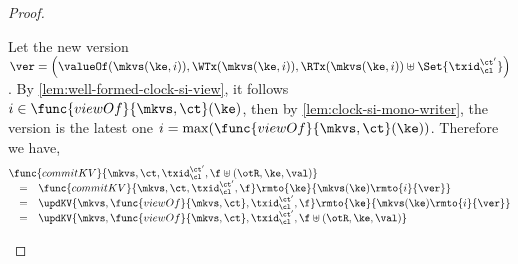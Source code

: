 \begin{proof}
\begin{itemize}
\[{                } 
            \]
            Let the new version \( \ver = \left( \valueOf(\mkvs(\ke,i)), \WTx(\mkvs(\ke,i)), \RTx(\mkvs(\ke,i)) \uplus \Set{\txid_\cl^{\ct'}} \right) \).
            By \cref{lem:well-formed-clock-si-view}, it follows \( i \in \func{viewOf}{\mkvs,\ct}(\ke) \), then by \cref{lem:clock-si-mono-writer}, the version is the latest one \( i = \max(\func{viewOf}{\mkvs,\ct}(\ke)) \).
            Therefore we have,
            \[
                \begin{array}{@{}l@{}}
                \func{commitKV}{\mkvs,\ct,\txid_\cl^{\ct'},\f \uplus (\otR, \ke, \val)}  \\
                \quad \begin{array}[t]{@{}c l@{}}
                = &
                \func{commitKV}{\mkvs,\ct,\txid_\cl^{\ct'},\f}\rmto{\ke}{\mkvs(\ke)\rmto{i}{\ver}} \\
                = & 
                \updKV{\mkvs,\func{viewOf}{\mkvs,\ct},\txid_\cl^{\ct'},\f}\rmto{\ke}{\mkvs(\ke)\rmto{i}{\ver}} \\
                = & 
                \updKV{\mkvs,\func{viewOf}{\mkvs,\ct},\txid_\cl^{\ct'},\f \uplus (\otR, \ke, \val)}
                \end{array}
                \end{array}
            \]
    \end{itemize}
\end{proof}

\begin{definition}
\end{definition}

